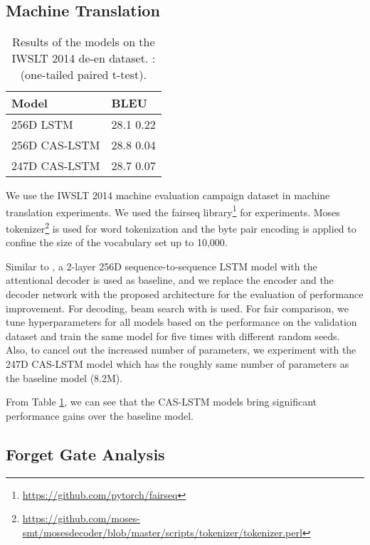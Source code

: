 \documentclass[wcp]{jmlr}
\begin{document}
    \subsection{Machine Translation}
    \begin{table}[tb]
        \centering
        \begin{tabular}{l l}
            \hline
            \bf{Model} & \bf{BLEU} \\
            \hline
            256D LSTM & 28.1  0.22 \\
            256D CAS-LSTM & 28.8  0.04 \\
            247D CAS-LSTM & 28.7  0.07 \\
            \hline
        \end{tabular}
        \caption{
            Results of the models on the IWSLT 2014 de-en dataset.
            :  (one-tailed paired t-test).
        }
        \label{table:mt}
    \end{table}
    We use the IWSLT 2014 machine evaluation campaign dataset \citep{cettolo2014report} in machine translation experiments.
    We used the fairseq library\footnote{\url{https://github.com/pytorch/fairseq}} \citep{gehring2017fairseq} for experiments.
    Moses tokenizer\footnote{\url{https://github.com/moses-smt/mosesdecoder/blob/master/scripts/tokenizer/tokenizer.perl}} is used for word tokenization and the byte pair encoding \citep{sennrich2016bpe} is applied to confine the size of the vocabulary set up to 10,000.
    
    Similar to \citet{wiseman2016nmt}, a 2-layer 256D sequence-to-sequence LSTM model with the attentional decoder is used as baseline, and we replace the encoder and the decoder network with the proposed architecture for the evaluation of performance improvement.
    For decoding, beam search with  is used.
    For fair comparison, we tune hyperparameters for all models based on the performance on the validation dataset and train the same model for five times with different random seeds.
    Also, to cancel out the increased number of parameters, we experiment with the 247D CAS-LSTM model which has the roughly same number of parameters as the baseline model (8.2M).
    
    From Table \ref{table:mt}, we can see that the CAS-LSTM models bring significant performance gains over the baseline model.
    
    \subsection{Forget Gate Analysis}
    
\end{document}
